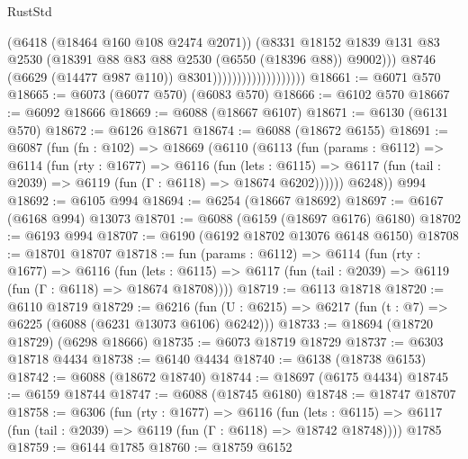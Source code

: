 \begin{lexlean}{RustStd}
\begin{coremodule}
                                            (@6418 (@18464 @160 @108 @2474 @2071))
                                            (@8331
                                              @18152
                                              @1839
                                              @131
                                              @83
                                              @2530
                                              (@18391
                                                @88
                                                @83
                                                @88
                                                @2530
                                                (@6550 (@18396 @88))
                                                @9002)))
                                          @8746
                                          (@6629 (@14477 @987 @110))
                                          @8301)))))))))))))))))))
@18661 := @6071 @570
@18665 := @6073 (@6077 @570) (@6083 @570)
@18666 := @6102 @570
@18667 := @6092 @18666
@18669 := @6088 (@18667 @6107)
@18671 := @6130 (@6131 @570)
@18672 := @6126 @18671
@18674 := @6088 (@18672 @6155)
@18691 := @6087
    (fun (fn : @102) =>
    @18669
      (@6110
        (@6113
          (fun (params : @6112) =>
          @6114
            (fun (rty : @1677) =>
            @6116
              (fun (lets : @6115) =>
              @6117 (fun (tail : @2039) => @6119 (fun (Γ : @6118) => @18674 @6202))))))
        @6248))
    @994
@18692 := @6105 @994
@18694 := @6254 (@18667 @18692)
@18697 := @6167 (@6168 @994) @13073
@18701 := @6088 (@6159 (@18697 @6176) @6180)
@18702 := @6193 @994
@18707 := @6190 (@6192 @18702 @13076 @6148 @6150)
@18708 := @18701 @18707
@18718 := fun (params : @6112) =>
  @6114
    (fun (rty : @1677) =>
    @6116
      (fun (lets : @6115) =>
      @6117 (fun (tail : @2039) => @6119 (fun (Γ : @6118) => @18674 @18708))))
@18719 := @6113 @18718
@18720 := @6110 @18719
@18729 := @6216
    (fun (U : @6215) => @6217 (fun (t : @7) => @6225 (@6088 (@6231 @13073 @6106) @6242)))
@18733 := @18694 (@18720 @18729) (@6298 @18666)
@18735 := @6073 @18719 @18729
@18737 := @6303 @18718 @4434
@18738 := @6140 @4434
@18740 := @6138 (@18738 @6153)
@18742 := @6088 (@18672 @18740)
@18744 := @18697 (@6175 @4434)
@18745 := @6159 @18744
@18747 := @6088 (@18745 @6180)
@18748 := @18747 @18707
@18758 := @6306
    (fun (rty : @1677) =>
    @6116
      (fun (lets : @6115) =>
      @6117 (fun (tail : @2039) => @6119 (fun (Γ : @6118) => @18742 @18748))))
    @1785
@18759 := @6144 @1785
@18760 := @18759 @6152

\end{coremodule}
\end{lexlean}
